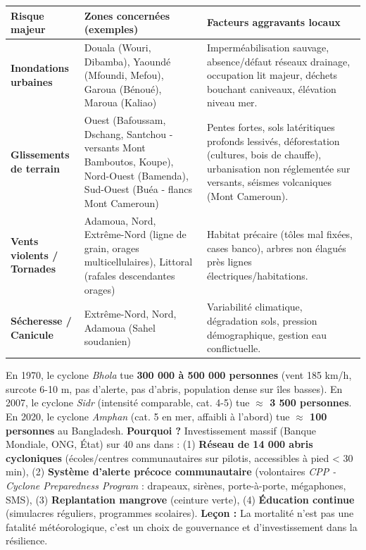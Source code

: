 \documentclass[11pt]{article}
\begin{document}
\begin{center}
\begin{tabularx}{\linewidth}{|l|X|X|}\hline
\rowcolor{popblueL}
\textbf{Risque majeur} & \textbf{Zones concernées (exemples)} & \textbf{Facteurs aggravants locaux} \\ \hline
\textbf{Inondations urbaines} & Douala (Wouri, Dibamba), Yaoundé (Mfoundi, Mefou), Garoua (Bénoué), Maroua (Kaliao) & Imperméabilisation sauvage, absence/défaut réseaux drainage, occupation lit majeur, déchets bouchant caniveaux, élévation niveau mer. \\ \hline
\textbf{Glissements de terrain} & Ouest (Bafoussam, Dschang, Santchou - versants Mont Bamboutos, Koupe), Nord-Ouest (Bamenda), Sud-Ouest (Buéa - flancs Mont Cameroun) & Pentes fortes, sols latéritiques profonds lessivés, déforestation (cultures, bois de chauffe), urbanisation non réglementée sur versants, séismes volcaniques (Mont Cameroun). \\ \hline
\textbf{Vents violents / Tornades} & Adamoua, Nord, Extrême-Nord (ligne de grain, orages multicellulaires), Littoral (rafales descendantes orages) & Habitat précaire (tôles mal fixées, cases banco), arbres non élagués près lignes électriques/habitations. \\ \hline
\textbf{Sécheresse / Canicule} & Extrême-Nord, Nord, Adamoua (Sahel soudanien) & Variabilité climatique, dégradation sols, pression démographique, gestion eau conflictuelle. \\ \hline
\end{tabularx}
\end{center}

\begin{savaistu}
En 1970, le cyclone \emph{Bhola} tue \textbf{300 000 à 500 000 personnes} (vent 185 km/h, surcote 6-10 m, pas d'alerte, pas d'abris, population dense sur îles basses).
En 2007, le cyclone \emph{Sidr} (intensité comparable, cat. 4-5) tue \textbf{$\approx$ 3 500 personnes}.
En 2020, le cyclone \emph{Amphan} (cat. 5 en mer, affaibli à l'abord) tue \textbf{$\approx$ 100 personnes} au Bangladesh.
\textbf{Pourquoi ?} Investissement massif (Banque Mondiale, ONG, État) sur 40 ans dans : (1) \textbf{Réseau de 14 000 abris cycloniques} (écoles/centres communautaires sur pilotis, accessibles à pied < 30 min), (2) \textbf{Système d'alerte précoce communautaire} (volontaires \emph{CPP - Cyclone Preparedness Program} : drapeaux, sirènes, porte-à-porte, mégaphones, SMS), (3) \textbf{Replantation mangrove} (ceinture verte), (4) \textbf{Éducation continue} (simulacres réguliers, programmes scolaires). \textbf{Leçon :} La mortalité n'est pas une fatalité météorologique, c'est un choix de gouvernance et d'investissement dans la résilience.
\end{savaistu}
\end{document}

